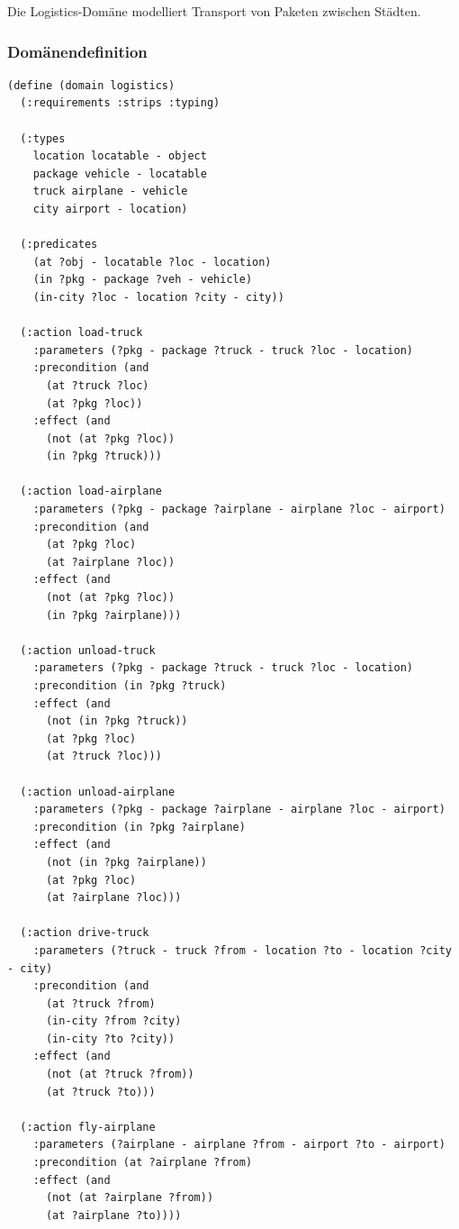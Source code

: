 ﻿\documentclass[a4paper,12pt]{article}
\theoremstyle{definition}
\begin{document}
Die Logistics-Domäne modelliert Transport von Paketen zwischen Städten.

\subsubsection{Domänendefinition}

\begin{lstlisting}[language=PDDL, caption=Logistics Domäne]
(define (domain logistics)
  (:requirements :strips :typing)
  
  (:types
    location locatable - object
    package vehicle - locatable
    truck airplane - vehicle
    city airport - location)
  
  (:predicates
    (at ?obj - locatable ?loc - location)
    (in ?pkg - package ?veh - vehicle)
    (in-city ?loc - location ?city - city))
  
  (:action load-truck
    :parameters (?pkg - package ?truck - truck ?loc - location)
    :precondition (and
      (at ?truck ?loc)
      (at ?pkg ?loc))
    :effect (and
      (not (at ?pkg ?loc))
      (in ?pkg ?truck)))
  
  (:action load-airplane
    :parameters (?pkg - package ?airplane - airplane ?loc - airport)
    :precondition (and
      (at ?pkg ?loc)
      (at ?airplane ?loc))
    :effect (and
      (not (at ?pkg ?loc))
      (in ?pkg ?airplane)))
  
  (:action unload-truck
    :parameters (?pkg - package ?truck - truck ?loc - location)
    :precondition (in ?pkg ?truck)
    :effect (and
      (not (in ?pkg ?truck))
      (at ?pkg ?loc)
      (at ?truck ?loc)))
  
  (:action unload-airplane
    :parameters (?pkg - package ?airplane - airplane ?loc - airport)
    :precondition (in ?pkg ?airplane)
    :effect (and
      (not (in ?pkg ?airplane))
      (at ?pkg ?loc)
      (at ?airplane ?loc)))
  
  (:action drive-truck
    :parameters (?truck - truck ?from - location ?to - location ?city - city)
    :precondition (and
      (at ?truck ?from)
      (in-city ?from ?city)
      (in-city ?to ?city))
    :effect (and
      (not (at ?truck ?from))
      (at ?truck ?to)))
  
  (:action fly-airplane
    :parameters (?airplane - airplane ?from - airport ?to - airport)
    :precondition (at ?airplane ?from)
    :effect (and
      (not (at ?airplane ?from))
      (at ?airplane ?to))))
\end{lstlisting}
\end{document}
